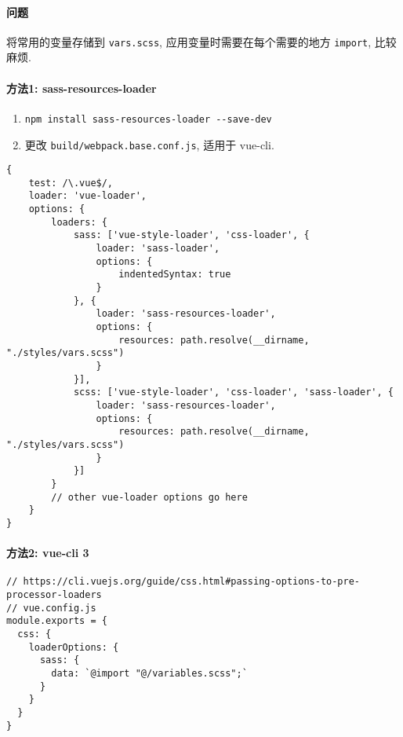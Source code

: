 \paragraph{问题}\label{ux95eeux9898}

将常用的变量存储到 \lstinline!vars.scss!, 应用变量时需要在每个需要的地方
\lstinline!import!, 比较麻烦.

\paragraph{方法1:
sass-resources-loader}\label{ux65b9ux6cd51-sass-resources-loader}

\begin{enumerate}
\def\labelenumi{\arabic{enumi}.}
\tightlist
\item
  \lstinline!npm install sass-resources-loader --save-dev!
\item
  更改 \lstinline!build/webpack.base.conf.js!, 适用于 vue-cli.
\end{enumerate}

\begin{lstlisting}
{
    test: /\.vue$/,
    loader: 'vue-loader',
    options: {
        loaders: {
            sass: ['vue-style-loader', 'css-loader', {
                loader: 'sass-loader',
                options: {
                    indentedSyntax: true
                }
            }, {
                loader: 'sass-resources-loader',
                options: {
                    resources: path.resolve(__dirname, "./styles/vars.scss")
                }
            }],
            scss: ['vue-style-loader', 'css-loader', 'sass-loader', {
                loader: 'sass-resources-loader',
                options: {
                    resources: path.resolve(__dirname, "./styles/vars.scss")
                }
            }]
        }
        // other vue-loader options go here
    }
}
\end{lstlisting}

\paragraph{方法2: vue-cli 3}\label{ux65b9ux6cd52-vue-cli-3}

\begin{lstlisting}
// https://cli.vuejs.org/guide/css.html#passing-options-to-pre-processor-loaders
// vue.config.js
module.exports = {
  css: {
    loaderOptions: {
      sass: {
        data: `@import "@/variables.scss";`
      }
    }
  }
}
\end{lstlisting}

